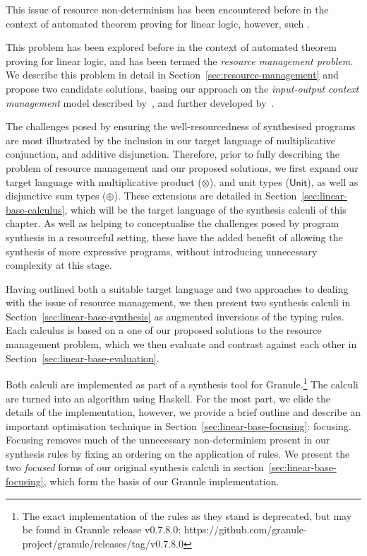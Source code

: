 This issue of resource non-determinism has been encountered before in the
context of automated theorem proving for linear logic, however, such . 
 
This problem has been explored before in the context of automated theorem
proving for linear logic, and has been termed the \textit{resource management
problem}. We describe this problem in detail in
Section~\ref{sec:resource-management} and propose two candidate solutions,
basing our approach on the \textit{input-output context management} model
described by~\citet{HODAS1994327}, and further developed
by~\citet{CERVESATO2000133}. 

The challenges posed by ensuring the well-resourcedness of synthesised programs
are most illustrated by the inclusion in our target language of multiplicative
conjunction, and additive disjunction. Therefore, prior to fully describing the
problem of resource management and our proposed solutions, we first expand our
target language with multiplicative product ($\otimes$), and unit types ($\mathsf{Unit}$),
as well as disjunctive sum types ($\oplus$). These extensions are detailed in
Section~\ref{sec:linear-base-calculus}, which will be the target language of the
synthesis calculi of this chapter. As well as helping to conceptualise the
challenges posed by program synthesis in a resourceful setting, these have the added benefit
of allowing the synthesis of more expressive programs, without introducing
unnecessary complexity at this stage.

Having outlined both a suitable target language and two approaches to dealing
with the issue of resource management, we then present two synthesis calculi in
Section~\ref{sec:linear-base-synthesis} as augmented inversions of the typing
rules. Each calculus is based on a one of our proposed solutions to the resource
management problem, which we then evaluate and contrast against each other in
Section~\ref{sec:linear-base-evaluation}. 

Both calculi are implemented as part of a synthesis tool for
Granule.\footnote{The exact implementation of the rules as they stand is
deprecated, but may be found in Granule release v0.7.8.0:
https://github.com/granule-project/granule/releases/tag/v0.7.8.0} The calculi
are turned into an algorithm using Haskell. For the most part, we elide the
details of the implementation, however, we provide a brief outline  
and describe an important optimisation technique in
Section~\ref{sec:linear-base-focusing}: focusing. Focusing removes much of the
unnecessary non-determinism present in our synthesis rules by fixing an ordering
on the application of rules. We present the two \textit{focused} forms of our
original synthesis calculi in section~\ref{sec:linear-base-focusing}, which
form the basis of our Granule implementation.

